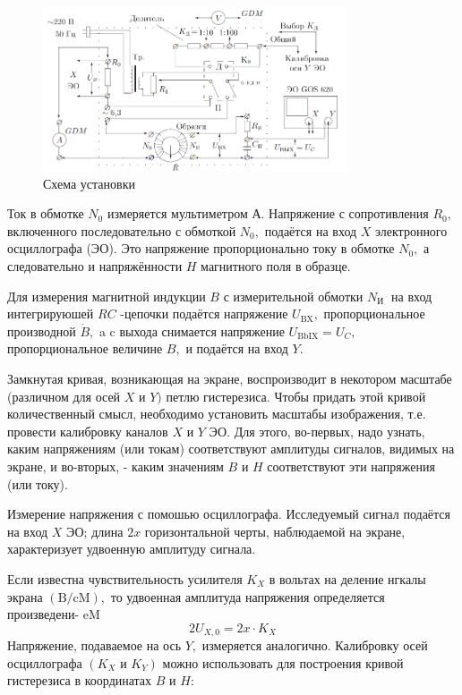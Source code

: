 \documentclass[a4paper,12pt]{article}
\begin{document}
\begin{figure}[H]
  \centering
    \includegraphics[width=0.8\textwidth]{apparatus.png}
    \caption{Схема установки}
    \label{fig:apparatus}
\end{figure}

Ток в обмотке $N_{0}$ измеряется мультиметром А. Напряжение с сопротивления $R_{0},$ включенного последовательно с обмоткой $N_{0},$ подаётся на вход $X$ электронного осциллографа (ЭО). Это напряжение пропорционально току в обмотке $N_{0},$ а следовательно и напряжённости $H$ магнитного поля в образце.

Для измерения магнитной индукции $B$ с измерительной обмотки $N_{\text {И }}$ на вход интегрируюшей $R C$ -цепочки подаётся напряжение $U_{\mathrm{BX}},$ пропорциональное производной $\dot{B},$ a $\mathrm{c}$ выхода снимается напряжение $U_{\mathrm{BbIX}}=U_{C},$ пропорциональное величине $B,$ и подаётся на вход $Y$.

Замкнутая кривая, возникающая на экране, воспроизводит в некотором масштабе (различном для осей $X$ и $Y)$ петлю гистерезиса. Чтобы придать этой кривой количественный смысл, необходимо установить масштабы изображения, т.е. провести калибровку каналов $X$ и $Y$ ЭО. Для этого, во-первых, надо узнать, каким напряжениям (или токам) соответствуют амплитуды сигналов, видимых на экране, и во-вторых, - каким значениям $B$ и $H$ соответствуют эти напряжения (или току).

Измерение напряжения с помошью осциллографа. Исследуемый сигнал подаётся на вход $X$ ЭО; длина $2 x$ горизонтальной черты, наблюдаемой на экране, характеризует удвоенную амплитуду сигнала.

Если известна чувствительность усилителя $K_{X}$ в вольтах на деление нгкалы экрана $(\mathrm{B} / \mathrm{cM}),$ то удвоенная амплитуда напряжения определяется произведени-
eM
$$
2 U_{X, 0}=2 x \cdot K_{X}
$$
Напряжение, подаваемое на ось $Y,$ измеряется аналогично. Калибровку осей осциллографа $\left(K_{X}\right.$ и $\left.K_{Y}\right)$ можно использовать для построения кривой гистерезиса в координатах $B$ и $H:$
\end{document}
